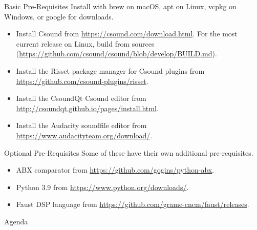 \documentclass{beamer}
\begin{document}
    \begin{frame}{Basic Pre-Requisites}
    	Install with brew on macOS, apt on Linux, vcpkg on Windows, or 
	google for downloads.
        \begin{itemize}
            \item Install Csound from
            \url{https://csound.com/download.html}. For the most current release on
            Linux, build from sources
            (\url{https://github.com/csound/csound/blob/develop/BUILD.md}).
            \item Install the Risset package manager for Csound plugins from 
            \url{https://github.com/csound-plugins/risset}. 
            \item Install the CsoundQt Csound editor from
            \url{http://csoundqt.github.io/pages/install.html}.
            \item Install the Audacity soundfile editor from
            \url{https://www.audacityteam.org/download/}.
        \end{itemize}
    \end{frame}
    
    \begin{frame}{Optional Pre-Requisites}
        Some of these have their own additional pre-requisites.
        \begin{itemize}
            \item ABX comparator from \url{https://github.com/gogins/python-abx}.
            \item Python 3.9 from \url{https://www.python.org/downloads/}.
            \item Faust DSP language from
            \url{https://github.com/grame-cncm/faust/releases}.
        \end{itemize}
    \end{frame}

    \begin{frame}{Agenda}
        \tableofcontents
    \end{frame}
\end{document}
